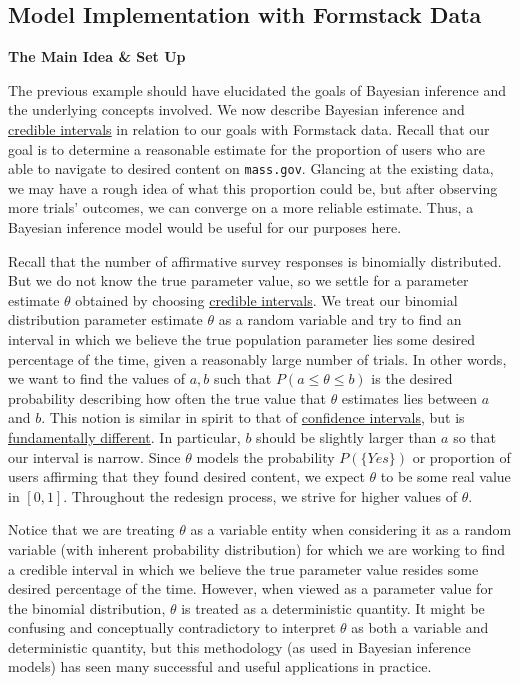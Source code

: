 \subsection*{Model Implementation with Formstack Data}

\textbf{The Main Idea \& Set Up}

The previous example should have elucidated the goals of Bayesian inference and the underlying concepts involved. We now describe Bayesian inference and \href{https://en.wikipedia.org/wiki/Credible_interval}{credible intervals} in relation to our goals with Formstack data. Recall that our goal is to determine a reasonable estimate for the proportion of users who are able to navigate to desired content on \texttt{mass.gov}. Glancing at the existing data, we may have a rough idea of what this proportion could be, but after observing more trials' outcomes, we can converge on a more reliable estimate. Thus, a Bayesian inference model would be useful for our purposes here.

Recall that the number of affirmative survey responses is binomially distributed. But we do not know the true parameter value, so we settle for a parameter estimate $\theta$ obtained by choosing \href{https://en.wikipedia.org/wiki/Credible_interval}{credible intervals}. We treat our binomial distribution parameter estimate $\theta$ as a random variable and try to find an interval in which we believe the true population parameter lies some desired percentage of the time, given a reasonably large number of trials. In other words, we want to find the values of $a, b$ such that $P(a \le \theta \le b)$ is the desired probability describing how often the true value that $\theta$ estimates lies between $a$ and $b$. This notion is similar in spirit to that of \href{https://en.wikipedia.org/wiki/Confidence_interval}{confidence intervals}, but is \href{https://en.wikipedia.org/wiki/Credible_interval#Contrasts_with_confidence_interval}{fundamentally different}. In particular, $b$ should be slightly larger than $a$ so that our interval is narrow. Since $\theta$ models the probability $P(\{\textit{Yes}\})$ or proportion of users affirming that they found desired content, we expect $\theta$ to be some real value in $[0,1]$. Throughout the redesign process, we strive for higher values of $\theta$.

Notice that we are treating $\theta$ as a variable entity when considering it as a random variable (with inherent probability distribution) for which we are working to find a credible interval in which we believe the true parameter value resides some desired percentage of the time. However, when viewed as a parameter value for the binomial distribution, $\theta$ is treated as a deterministic quantity. It might be confusing and conceptually contradictory to interpret $\theta$ as both a variable and deterministic quantity, but this methodology (as used in Bayesian inference models) has seen many successful and useful applications in practice.

